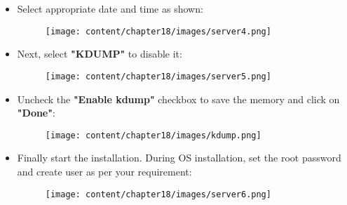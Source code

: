 \begin{flushleft}
\begin{itemize}
	
	
	\item Select appropriate date and time as shown:
	\begin{figure}[h!]
		\centering
		\texttt{[image: content/chapter18/images/server4.png]}
	\end{figure}		
	\newpage
	\item Next, select \textbf{"KDUMP"} to disable it:
	\begin{figure}[h!]
		\centering
		\texttt{[image: content/chapter18/images/server5.png]}
	\end{figure}			

	\item Uncheck the \textbf{"Enable kdump"} checkbox to save the memory and click on \textbf{"Done"}:
	\begin{figure}[h!]
		\centering
		\texttt{[image: content/chapter18/images/kdump.png]}
	\end{figure}			

	\item Finally start the installation. During OS installation, set the root password and create user as per your requirement:
	\begin{figure}[h!]
		\centering
		\texttt{[image: content/chapter18/images/server6.png]}
	\end{figure}		


 \end{itemize}

\end{flushleft}
